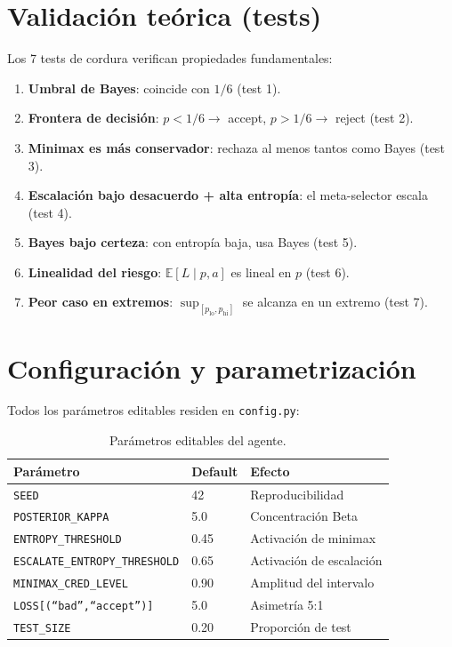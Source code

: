 \documentclass[11pt,a4paper]{article}
\theoremstyle{definition}
\newcommand{\E}{\mathbb{E}}
\begin{document}
\section{Validación teórica (tests)}

Los 7 tests de cordura verifican propiedades fundamentales:

\begin{enumerate}
	\item \textbf{Umbral de Bayes}: coincide con $1/6$ (test 1).
	\item \textbf{Frontera de decisión}: $p < 1/6 \to$ accept, $p > 1/6 \to$ reject (test 2).
	\item \textbf{Minimax es más conservador}: rechaza al menos tantos como Bayes (test 3).
	\item \textbf{Escalación bajo desacuerdo + alta entropía}: el meta-selector escala (test 4).
	\item \textbf{Bayes bajo certeza}: con entropía baja, usa Bayes (test 5).
	\item \textbf{Linealidad del riesgo}: $\E[L\mid p,a]$ es lineal en $p$ (test 6).
	\item \textbf{Peor caso en extremos}: $\sup_{[p_{\text{lo}},p_{\text{hi}}]}$
	      se alcanza en un extremo (test 7).
\end{enumerate}

\section{Configuración y parametrización}

Todos los parámetros editables residen en \texttt{config.py}:

\begin{table}[h]
	\centering
	\begin{tabular}{lll}
		\toprule
		\textbf{Parámetro}                      & \textbf{Default} & \textbf{Efecto}          \\ \midrule
		\texttt{SEED}                           & 42               & Reproducibilidad         \\
		\texttt{POSTERIOR\_KAPPA}               & 5.0              & Concentración Beta       \\
		\texttt{ENTROPY\_THRESHOLD}             & 0.45             & Activación de minimax    \\
		\texttt{ESCALATE\_ENTROPY\_THRESHOLD}   & 0.65             & Activación de escalación \\
		\texttt{MINIMAX\_CRED\_LEVEL}           & 0.90             & Amplitud del intervalo   \\
		\texttt{LOSS{[}(``bad'',``accept''){]}} & 5.0              & Asimetría 5:1            \\
		\texttt{TEST\_SIZE}                     & 0.20             & Proporción de test       \\ \bottomrule
	\end{tabular}
	\caption{Parámetros editables del agente.}
	\label{tab:params}
\end{table}
\end{document}
